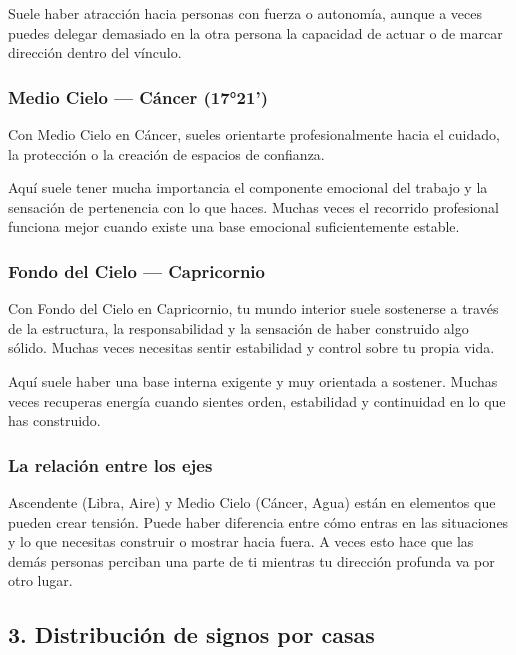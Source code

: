 \documentclass[11pt,a4paper]{article}
\begin{document}
Suele haber atracción hacia personas con fuerza o autonomía, aunque a veces puedes delegar demasiado en la otra persona la capacidad de actuar o de marcar dirección dentro del vínculo.

\subsubsection*{Medio Cielo — Cáncer (17°21')}
Con Medio Cielo en Cáncer, sueles orientarte profesionalmente hacia el cuidado, la protección o la creación de espacios de confianza.

Aquí suele tener mucha importancia el componente emocional del trabajo y la sensación de pertenencia con lo que haces. Muchas veces el recorrido profesional funciona mejor cuando existe una base emocional suficientemente estable.

\subsubsection*{Fondo del Cielo — Capricornio}
Con Fondo del Cielo en Capricornio, tu mundo interior suele sostenerse a través de la estructura, la responsabilidad y la sensación de haber construido algo sólido. Muchas veces necesitas sentir estabilidad y control sobre tu propia vida.

Aquí suele haber una base interna exigente y muy orientada a sostener. Muchas veces recuperas energía cuando sientes orden, estabilidad y continuidad en lo que has construido.

\subsubsection*{La relación entre los ejes}
Ascendente (Libra, Aire) y Medio Cielo (Cáncer, Agua) están en elementos que pueden crear tensión. Puede haber diferencia entre cómo entras en las situaciones y lo que necesitas construir o mostrar hacia fuera. A veces esto hace que las demás personas perciban una parte de ti mientras tu dirección profunda va por otro lugar.

\vspace{0.5cm}

\subsection{3. Distribución de signos por casas}
\end{document}

